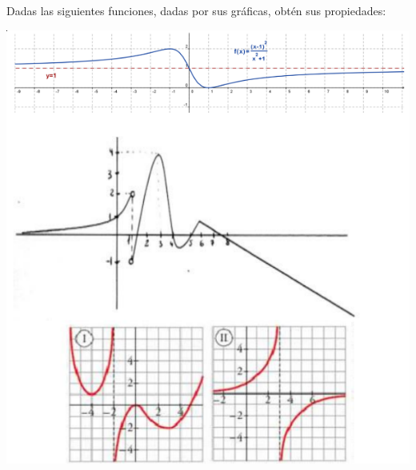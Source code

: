 \documentclass[spanish, 11pt]{exam}
\begin{document}
\begin{questions}
%
%
%
%
%

\question Dadas las siguientes funciones, dadas por sus gráficas, obtén sus propiedades:

\includegraphics[width=0.61\columnwidth]{funcion2}


\end{questions}
\end{document}
